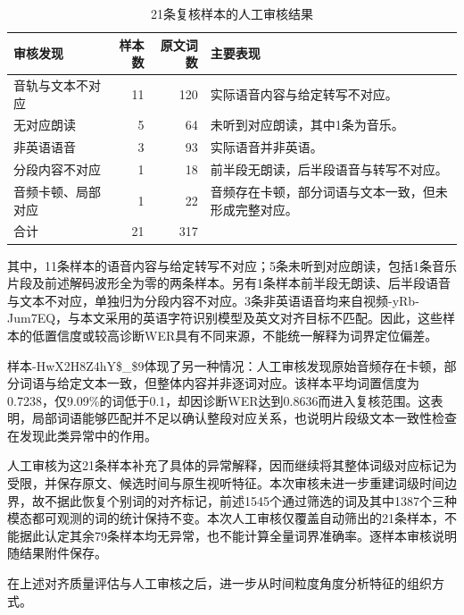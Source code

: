 \begin{table}[H]
    \centering\small
    \caption{21条复核样本的人工审核结果}
    \label{tab:p1_manual_review}
    \setlength{\tabcolsep}{5pt}
    \renewcommand{\arraystretch}{1.2}
    \begin{tabular}{@{}lrr>{\raggedright\arraybackslash}p{5.0cm}@{}}
        \toprule
        审核发现 & 样本数 & 原文词数 & 主要表现\\ \midrule
        音轨与文本不对应 & 11 & 120 & 实际语音内容与给定转写不对应。\\
        无对应朗读 & 5 & 64 & 未听到对应朗读，其中1条为音乐。\\
        非英语语音 & 3 & 93 & 实际语音并非英语。\\
        分段内容不对应 & 1 & 18 & 前半段无朗读，后半段语音与转写不对应。\\
        音频卡顿、局部对应 & 1 & 22 & 音频存在卡顿，部分词语与文本一致，但未形成完整对应。\\
        \midrule
        合计 & 21 & 317 & \\
        \bottomrule
    \end{tabular}
\end{table}


其中，11条样本的语音内容与给定转写不对应；5条未听到对应朗读，包括1条音乐片段及前述解码波形全为零的两条样本。另有1条样本前半段无朗读、后半段语音与文本不对应，单独归为分段内容不对应。3条非英语语音均来自视频-yRb-Jum7EQ，与本文采用的英语字符识别模型及英文对齐目标不匹配。因此，这些样本的低置信度或较高诊断WER具有不同来源，不能统一解释为词界定位偏差。

样本-HwX2H8Z4hY\$\_\$9体现了另一种情况：人工审核发现原始音频存在卡顿，部分词语与给定文本一致，但整体内容并非逐词对应。该样本平均词置信度为0.7238，仅9.09\%的词低于0.1，却因诊断WER达到0.8636而进入复核范围。这表明，局部词语能够匹配并不足以确认整段对应关系，也说明片段级文本一致性检查在发现此类异常中的作用。

人工审核为这21条样本补充了具体的异常解释，因而继续将其整体词级对应标记为受限，并保存原文、候选时间与原生视听特征。本次审核未进一步重建词级时间边界，故不据此恢复个别词的对齐标记，前述1545个通过筛选的词及其中1387个三种模态都可观测的词的统计保持不变。本次人工审核仅覆盖自动筛出的21条样本，不能据此认定其余79条样本均无异常，也不能计算全量词界准确率。逐样本审核说明随结果附件保存。

\label{sec:p1_window_analysis}

在上述对齐质量评估与人工审核之后，进一步从时间粒度角度分析特征的组织方式。

